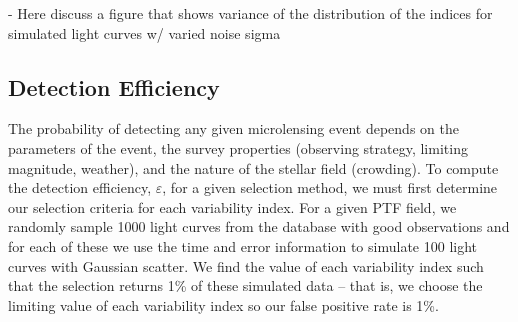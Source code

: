 \documentclass[12pt,preprint]{aastex}
\begin{document}
- Here discuss a figure that shows variance of the distribution of the indices for simulated light curves w/ varied noise sigma



\subsection{Detection Efficiency}
The probability of detecting any given microlensing event depends on the parameters of the event, the survey properties (observing strategy, limiting magnitude, weather), and the nature of the stellar field (crowding). To compute the detection efficiency, $\varepsilon$, for a given selection method, we must first determine our selection criteria for each variability index. For a given PTF field, we randomly sample 1000 light curves from the database with good observations and for each of these we use the time and error information to simulate 100 light curves with Gaussian scatter. We find the value of each variability index such that the selection returns 1\% of these simulated data -- that is, we choose the limiting value of each variability index so our false positive rate is 1\%.
\end{document}
